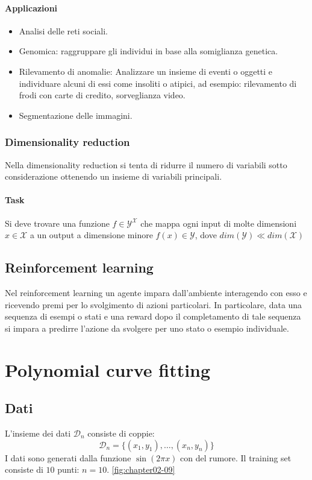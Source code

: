 \paragraph{Applicazioni}
\begin{multicols}{2}
	\begin{itemize}
		\item Analisi delle reti sociali.
		\item Genomica: raggruppare gli individui in base alla somiglianza genetica.
		\item Rilevamento di anomalie: Analizzare un insieme di eventi o oggetti e individuare alcuni di essi come insoliti o atipici, ad esempio: rilevamento di frodi con carte di credito, sorveglianza video.
		\item Segmentazione delle immagini.
	\end{itemize}
\end{multicols}

\subsubsection{Dimensionality reduction}
Nella dimensionality reduction si tenta di ridurre il numero di variabili sotto considerazione ottenendo un insieme di variabili principali.

\paragraph{Task}
Si deve trovare una funzione $f\in\mathcal{Y}^\mathcal{X}$ che mappa ogni input di molte dimensioni $x\in\mathcal{X}$ a un output a dimensione minore $f(x)\in\mathcal{Y}$, dove $dim(\mathcal{Y})\ll dim(\mathcal{X})$

\subsection{Reinforcement learning}
Nel reinforcement learning un agente impara dall'ambiente interagendo con esso e ricevendo premi per lo svolgimento di azioni particolari.
In particolare, data una sequenza di esempi o stati e una reward dopo il completamento di tale sequenza si impara a predirre l'azione da svolgere per uno stato o esempio individuale.

\section{Polynomial curve fitting}

\subsection{Dati}
L'insieme dei dati $\mathcal{D}_n$ consiste di coppie:
$$\mathcal{D}_n = \{(x_1, y_1),\dots,(x_n,y_n)\}$$
I dati sono generati dalla funzione $\sin(2\pi x)$ con del rumore.
Il training set consiste di $10$ punti: $n = 10$. \ref{fig:chapter02-09}


